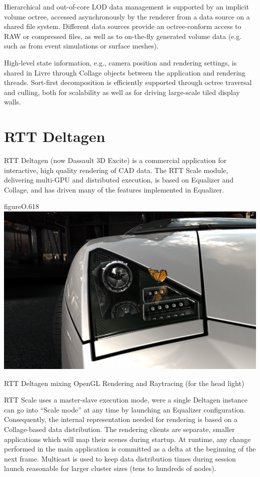 Hierarchical and out-of-core LOD data management is supported by an implicit
volume octree, accessed asynchronously by the renderer from a data source on a
shared file system. Different data sources provide an octree-conform access to
RAW or compressed files, as well as to on-the-fly generated volume data (e.g.
such as from event simulations or surface meshes).

High-level state information, e.g., camera position and rendering settings, is
shared in Livre through \textsf{Collage} objects between the application and
rendering threads. Sort-first decomposition is efficiently supported through
octree traversal and culling, both for scalability as well as for driving
large-scale tiled display walls.

\section{RTT Deltagen}

RTT Deltagen (now Dassault 3D Excite) is a commercial application for
interactive, high quality rendering of CAD data. The RTT Scale module,
delivering multi-GPU and distributed execution, is based on \textsf{Equalizer}
and \textsf{Collage}, and has driven many of the features implemented in
Equalizer.

\begin{wrapfloat}{figure}{O}{.618\textwidth}
  \includegraphics[width=.618\textwidth]{images/DeltaGen}
  {\caption{\label{fDeltaGen}RTT Deltagen mixing OpenGL Rendering and Raytracing (for the head light)}}
\end{wrapfloat}

RTT Scale uses a master-slave execution mode, were a single Deltagen instance
can go into ``Scale mode'' at any time by launching an \textsf{Equalizer}
configuration. Consequently, the internal representation needed for rendering
is based on a \textsf{Collage}-based data distribution. The rendering clients
are separate, smaller applications which will map their scenes during startup.
At runtime, any change performed in the main application is committed as a
delta at the beginning of the next frame. Multicast is used to keep data
distribution times during session launch reasonable for larger cluster sizes
(tens to hundreds of nodes).


